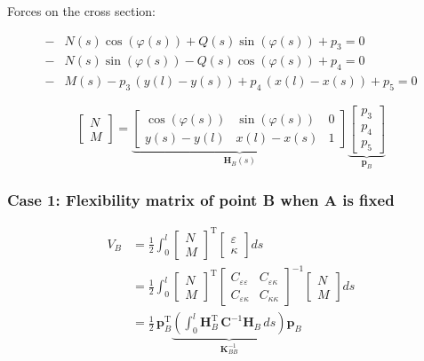 Forces on the cross section:

\begin{align*}
-&N(s)\cos(\varphi(s)) + Q(s)\sin(\varphi(s)) + p_3 = 0 \\
-&N(s)\sin(\varphi(s)) - Q(s)\cos(\varphi(s)) + p_4 = 0 \\
-&M(s) - p_3\,(y(l)-y(s)) + p_4\,(x(l) - x(s)) + p_5 = 0
\end{align*}

\begin{equation}
\begin{bmatrix}
N \\ M
\end{bmatrix}
=
\underbrace{
\begin{bmatrix}
\cos(\varphi(s)) & \sin(\varphi(s)) & 0 \\
y(s) - y(l) & x(l) - x(s) & 1
\end{bmatrix}
}_{\boldsymbol{H}_B(s)}
\underbrace{
\begin{bmatrix}
p_3 \\ p_4 \\ p_5
\end{bmatrix}
}_{\boldsymbol{p}_B}
\end{equation}


\subsubsection*{Case 1: Flexibility matrix of point B when A is fixed}

\begin{align}
V_B &= \frac{1}{2}\int_{0}^{l}
\begin{bmatrix}
N \\ M
\end{bmatrix}^\mathrm{T}
\begin{bmatrix}
\varepsilon \\ \kappa
\end{bmatrix}
ds \\
&= \frac{1}{2}\int_{0}^{l}
\begin{bmatrix}
N \\ M
\end{bmatrix}^\mathrm{T}
\begin{bmatrix}
C_{\varepsilon\varepsilon} & C_{\varepsilon\kappa}\\
C_{\varepsilon\kappa} & C_{\kappa\kappa}
\end{bmatrix}^{-1}
\begin{bmatrix}
N \\ M
\end{bmatrix}
ds \\
&= \frac{1}{2}\,\boldsymbol{p}_B^\mathrm{T}
\underbrace{
\left(\int_{0}^{l} \boldsymbol{H}_B^\mathrm{T}\,
\boldsymbol{C}^{-1}\boldsymbol{H}_B\,ds\right)
}_{\boldsymbol{K}_{BB}^{-1}}
\boldsymbol{p}_B
\end{align}

